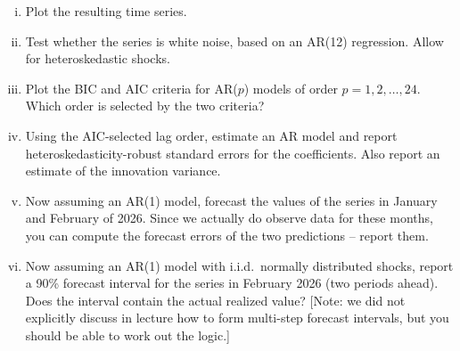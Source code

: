\documentclass[12pt]{article}
\theoremstyle{plain}
\begin{document}
\begin{enumerate}[i)]
\item Plot the resulting time series.
\item Test whether the series is white noise, based on an AR(12) regression. Allow for heteroskedastic shocks.
\item Plot the BIC and AIC criteria for AR($p$) models of order $p=1,2,\dots,24$. Which order is selected by the two criteria?
\item Using the AIC-selected lag order, estimate an AR model and report heteroskedasticity-robust standard errors for the coefficients. Also report an estimate of the innovation variance.
\item Now assuming an AR(1) model, forecast the values of the series in January and February of 2026. Since we actually do observe data for these months, you can compute the forecast errors of the two predictions -- report them.
\item Now assuming an AR(1) model with i.i.d.\ normally distributed shocks, report a 90\% forecast interval for the series in February 2026 (two periods ahead). Does the interval contain the actual realized value? [Note: we did not explicitly discuss in lecture how to form multi-step forecast intervals, but you should be able to work out the logic.]
\end{enumerate}
\end{document}
